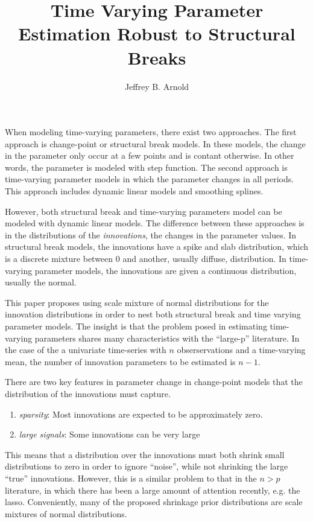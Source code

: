 \documentclass{article}
\author{Jeffrey B. Arnold}
\title{Time Varying Parameter Estimation Robust to Structural Breaks}
\begin{document}
\maketitle{}

When modeling time-varying parameters, there exist two approaches. 
The first approach is change-point or structural break models. 
In these models, the change in the parameter only occur at a few points and is contant otherwise.
In other words, the parameter is modeled with step function.
The second approach is time-varying parameter models in which the parameter changes in all periods.
This approach includes dynamic linear models and smoothing splines.

However, both structural break and time-varying parameters model can be modeled with dynamic linear models.
The difference between these approaches is in the distributions of the \textit{innovations}, the changes in the parameter values.
In structural break models, the innovations have a spike and slab distribution, which is a discrete mixture between 0 and another, usually diffuse, distribution.
In time-varying parameter models, the innovations are given a continuous distribution, usually the normal.

This paper proposes using scale mixture of normal distributions for the innovation distributions in order to nest both structural break and time varying parameter models.
The insight is that the problem posed in estimating time-varying parameters shares many characteristics with the ``large-p'' literature.
In the case of the a univariate time-series with $n$ obserservations and a time-varying mean, the number of innovation parameters to be estimated is $n - 1$.

There are two key features in parameter change in change-point models that the distribution of the innovations must capture.
\begin{enumerate}
\item \textit{sparsity}: Most innovations are expected to be approximately zero.
\item \textit{large signals}: Some innovations can be very large
\end{enumerate}
This means that a distribution over the innovations must both shrink small distributions to zero in order to ignore ``noise'', while not shrinking the large ``true'' innovations.
However, this is a similar problem to that in the $n > p$ literature, in which there has been a large amount of attention recently, e.g. the lasso.
Conveniently, many of the proposed shrinkage prior distributions are scale mixtures of normal distributions.
\end{document}
